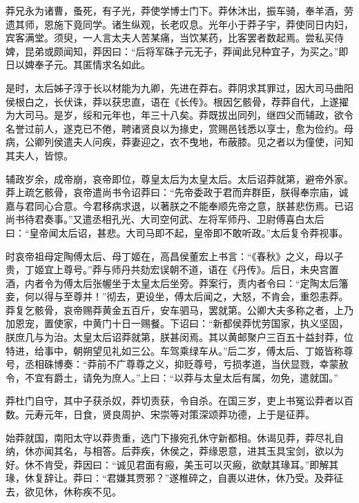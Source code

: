\documentclass[12pt,UTF8]{ctexbook}
\begin{document}
莽兄永为诸曹，蚤死，有子光，莽使学博士门下。莽休沐出，振车骑，奉羊酒，劳遗其师，恩施下竟同学。诸生纵观，长老叹息。光年小于莽子宇，莽使同日内妇，宾客满堂。须臾，一人言太夫人苦某痛，当饮某药，比客罢者数起焉。尝私买侍婢，昆弟或颇闻知，莽因曰：“后将军硃子元无子，莽闻此兒种宜子，为买之。”即日以婢奉子元。其匿情求名如此。



是时，太后姊子淳于长以材能为九卿，先进在莽右。莽阴求其罪过，因大司马曲阳侯根白之，长伏诛，莽以获忠直，语在《长传》。根因乞骸骨，荐莽自代，上遂擢为大司马。是岁，绥和元年也，年三十八矣。莽既拔出同列，继四父而辅政，欲令名誉过前人，遂克已不倦，聘诸贤良以为掾史，赏赐邑钱悉以享士，愈为俭约。母病，公卿列侯遣夫人问疾，莽妻迎之，衣不曳地，布蔽膝。见之者以为僮使，问知其夫人，皆惊。



辅政岁余，成帝崩，哀帝即位，尊皇太后为太皇太后。太后诏莽就第，避帝外家。莽上疏乞骸骨，哀帝遣尚书令诏莽曰：“先帝委政于君而弃群臣，朕得奉宗庙，诚嘉与君同心合意。今君移病求退，以著朕之不能奉顺先帝之意，朕甚悲伤焉。已诏尚书待君奏事。”又遣丞相孔光、大司空何武、左将军师丹、卫尉傅喜白太后曰：“皇帝闻太后诏，甚悲。大司马即不起，皇帝即不敢听政。”太后复令莽视事。



时哀帝祖母定陶傅太后、母丁姬在，高昌侯董宏上书言：“《春秋》之义，母以子贵，丁姬宜上尊号。”莽与师丹共劾宏误朝不道，语在《丹传》。后日，未央宫置酒，内者令为傅太后张幄坐于太皇太后坐旁。莽案行，责内者令曰：“定陶太后籓妾，何以得与至尊并！”彻去，更设坐，傅太后闻之，大怒，不肯会，重怨恚莽。莽复乞骸骨，哀帝赐莽黄金五百斤，安车驷马，罢就第。公卿大夫多称之者，上乃加恩宠，置使家，中黄门十日一赐餐。下诏曰：“新都侯莽忧劳国家，执义坚固，朕庶几与为治。太皇太后诏莽就第，朕甚闵焉。其以黄邮聚户三百五十益封莽，位特进，给事中，朝朔望见礼如三公。车驾乘绿车从。”后二岁，傅太后、丁姬皆称尊号，丞相硃博奏：“莽前不广尊尊之义，抑贬尊号，亏损孝道，当伏显戮，幸蒙赦令，不宜有爵土，请免为庶人。”上曰：“以莽与太皇太后有属，勿免，遣就国。”



莽杜门自守，其中子获杀奴，莽切责获，令自杀。在国三岁，吏上书冤讼莽者以百数。元寿元年，日食，贤良周护、宋崇等对策深颂莽功德，上于是征莽。



始莽就国，南阳太守以莽贵重，选门下掾宛孔休守新都相。休谒见莽，莽尽礼自纳，休亦闻其名，与相答。后莽疾，休侯之，莽缘恩意，进其玉具宝剑，欲以为好。休不肯受，莽因曰：“诚见君面有瘢，美玉可以灭瘢，欲献其瑑耳。”即解其瑑，休复辞让。莽曰：“君嫌其贾邪？”遂椎碎之，自裹以进休，休乃受。及莽征去，欲见休，休称疾不见。
\end{document}
